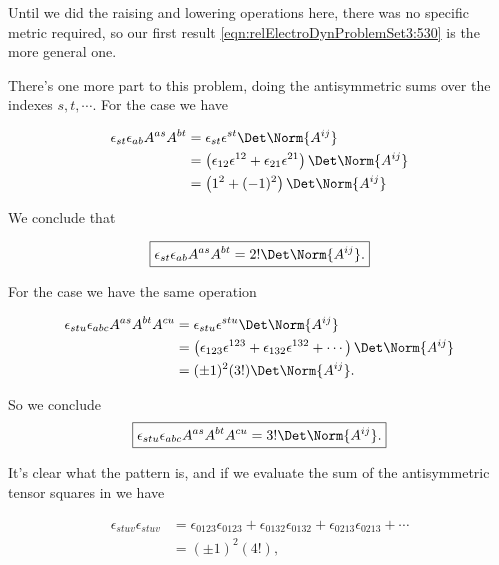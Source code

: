 Until we did the raising and lowering operations here, there was no specific metric required, so our first result \ref{eqn:relElectroDynProblemSet3:530} is the more general one.

There's one more part to this problem, doing the antisymmetric sums over the indexes $s, t, \cdots$.  For the  case we have

\begin{align*}
\epsilon_{s t} \epsilon_{a b} A^{a s} A^{b t}
&=
\epsilon_{s t} \epsilon^{s t} \Det \Norm{A^{ij}} \\
&=
\left( 
\epsilon_{1 2} \epsilon^{1 2} 
+\epsilon_{2 1} \epsilon^{2 1} 
\right)
\Det \Norm{A^{ij}} \\
&=
\left( 
1^2 + (-1)^2
\right)
\Det \Norm{A^{ij}}
\end{align*}

We conclude that

\begin{equation}\label{eqn:relElectroDynProblemSet3:600}
\boxed{
\epsilon_{s t} \epsilon_{a b} A^{a s} A^{b t} = 2! \Det \Norm{A^{ij}}.
}
\end{equation}

For the  case we have the same operation

\begin{align*}
\epsilon_{s t u} \epsilon_{a b c} A^{a s} A^{b t} A^{c u}
&=
\epsilon_{s t u} \epsilon^{s t u} \Det \Norm{A^{ij}} \\
&=
\left( 
\epsilon_{1 2 3} \epsilon^{1 2 3} 
+\epsilon_{1 3 2} \epsilon^{1 3 2} 
+ \cdots
\right)
\Det \Norm{A^{ij}} \\
&=
(\pm 1)^2 (3!)
\Det \Norm{A^{ij}}.
\end{align*}

So we conclude
\begin{equation}\label{eqn:relElectroDynProblemSet3:620}
\boxed{
\epsilon_{s t u} \epsilon_{a b c} A^{a s} A^{b t} A^{c u}= 3! \Det \Norm{A^{ij}}.
}
\end{equation}

It's clear what the pattern is, and if we evaluate the sum of the antisymmetric tensor squares in  we have

\begin{align*}
\epsilon_{s t u v} \epsilon_{s t u v}
&=
\epsilon_{0 1 2 3} \epsilon_{0 1 2 3}
+
\epsilon_{0 1 3 2} \epsilon_{0 1 3 2}
+
\epsilon_{0 2 1 3} \epsilon_{0 2 1 3}
+ \cdots \\
&= (\pm 1)^2 (4!),
\end{align*}

